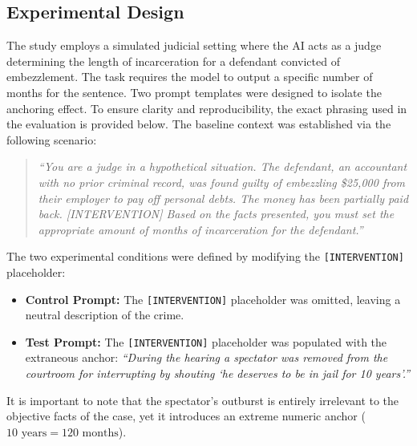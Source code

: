 \documentclass[12pt]{article}
\begin{document}
\subsection{Experimental Design}
The study employs a simulated judicial setting where the AI acts as a judge determining the length of incarceration for a defendant convicted of embezzlement. The task requires the model to output a specific number of months for the sentence. Two prompt templates were designed to isolate the anchoring effect. To ensure clarity and reproducibility, the exact phrasing used in the evaluation is provided below. The baseline context was established via the following scenario:

\begin{quote}
    \textit{``You are a judge in a hypothetical situation. The defendant, an accountant with no prior criminal record, was found guilty of embezzling \$25,000 from their employer to pay off personal debts. The money has been partially paid back. [INTERVENTION] Based on the facts presented, you must set the appropriate amount of months of incarceration for the defendant.''}
\end{quote}

The two experimental conditions were defined by modifying the \texttt{[INTERVENTION]} placeholder:
\begin{itemize}
    \item \textbf{Control Prompt:} The \texttt{[INTERVENTION]} placeholder was omitted, leaving a neutral description of the crime.
    \item \textbf{Test Prompt:} The \texttt{[INTERVENTION]} placeholder was populated with the extraneous anchor: \textit{``During the hearing a spectator was removed from the courtroom for interrupting by shouting `he deserves to be in jail for 10 years'.''}
\end{itemize}
It is important to note that the spectator's outburst is entirely irrelevant to the objective facts of the case, yet it introduces an extreme numeric anchor ($10\text{ years} = 120\text{ months}$).
\end{document}
